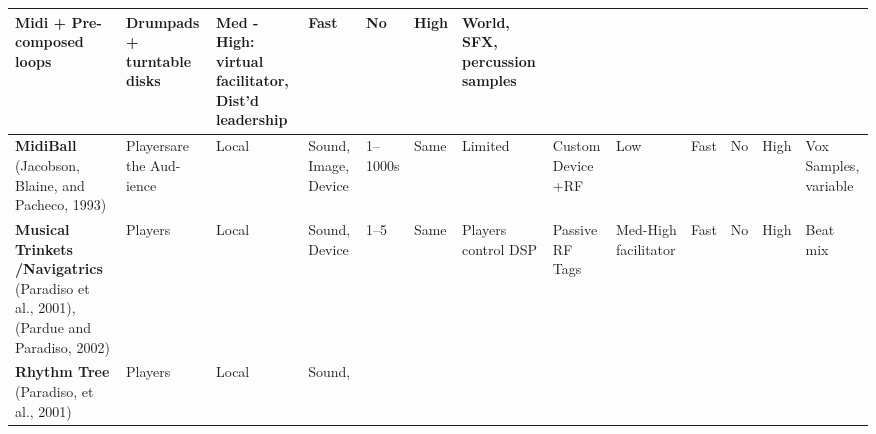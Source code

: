 \begin{center}
\begin{table}[ht]
\begin{tabular}{|p{41pt}|p{22pt}|p{22pt}|p{26pt}|p{17pt}|p{26pt}|p{31pt}|p{35pt}|p{33pt}|p{24pt}|p{35pt}|p{26pt}|p{36pt}|}
{{\small Midi + Pre-composed loops}
} & \parbox{35pt}{\centering 
{\small Drumpads + turntable disks}
} & \parbox{33pt}{\centering 
{\small Med -High: virtual facilitator, Dist'd leadership}
} & \parbox{24pt}{\centering 
{\small Fast}
} & \parbox{35pt}{\centering 
{\small No}
} & \parbox{26pt}{\centering 
{\small High}
} & \parbox{36pt}{\raggedright 
{\small World, SFX, percussion samples}
} \\
\hline
\parbox{41pt}{\raggedright 
{\small \textbf{MidiBall }(Jacobson, Blaine,  and Pacheco, 1993)}
} & \parbox{22pt}{\raggedright 
{\small Playersare the Aud-ience}
} & \parbox{22pt}{\raggedright 
{\small Local}
} & \parbox{26pt}{\raggedright 
{\small Sound, Image, Device}
} & \parbox{17pt}{\raggedright 
{\small 1--1000s}
} & \parbox{26pt}{\raggedright 
{\small Same}
} & \parbox{31pt}{\centering 
{\small Limited}
} & \parbox{35pt}{\centering 
{\small Custom Device +RF}
} & \parbox{33pt}{\centering 
{\small Low}
} & \parbox{24pt}{\centering 
{\small Fast}
} & \parbox{35pt}{\centering 
{\small No}
} & \parbox{26pt}{\centering 
{\small High}
} & \parbox{36pt}{\raggedright 
{\small Vox Samples, variable}
} \\
\hline
\parbox{41pt}{\raggedright 
{\small \textbf{Musical Trinkets /Navigatrics }(Paradiso et al., 2001), (Pardue
and Paradiso, 2002)}
} & \parbox{22pt}{\raggedright 
{\small Players}
} & \parbox{22pt}{\raggedright 
{\small Local}
} & \parbox{26pt}{\raggedright 
{\small Sound, Device}
} & \parbox{17pt}{\raggedright 
{\small 1--5}
} & \parbox{26pt}{\raggedright 
{\small Same}
} & \parbox{31pt}{\centering 
{\small Players control DSP}
} & \parbox{35pt}{\centering 
{\small Passive RF Tags}
} & \parbox{33pt}{\centering 
{\small Med-High facilitator}
} & \parbox{24pt}{\centering 
{\small Fast}
} & \parbox{35pt}{\centering 
{\small No}
} & \parbox{26pt}{\centering 
{\small High}
} & \parbox{36pt}{\raggedright 
{\small Beat mix}
} \\
\hline
\parbox{41pt}{\raggedright 
{\small \textbf{Rhythm Tree }(Paradiso, et al., 2001)}
} & \parbox{22pt}{\raggedright 
{\small Players}
} & \parbox{22pt}{\raggedright 
{\small Local}
} & \parbox{26pt}{\raggedright 
{\small Sound, }

}
\end{tabular}
\end{table}
\end{center}
